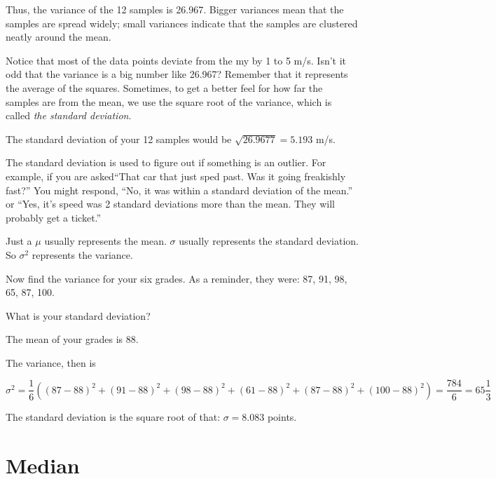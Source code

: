 Thus, the variance of the 12 samples is 26.967.  Bigger variances mean
that the samples are spread widely; small variances indicate that the
samples are clustered neatly around the mean.

Notice that most of the data points deviate from the my by 1 to 5
m/s. Isn't it odd that the variance is a big number like 26.967?
Remember that it represents the average of the squares. Sometimes, to
get a better feel for how far the samples are from the mean, we use
the square root of the variance, which is called \textit{the standard
  deviation}.

The standard deviation of your 12 samples would be $\sqrt{26.9677} =
  5.193$ m/s.

The standard deviation is used to figure out if something is an
outlier. For example, if you are asked``That car that just sped
past. Was it going freakishly fast?'' You might respond, ``No, it was
within a standard deviation of the mean.'' or ``Yes, it's speed was 2
standard deviations more than the mean. They will probably get a ticket.''

Just a $\mu$ usually represents the mean. $\sigma$ usually represents
the standard deviation.  So $\sigma^2$ represents the variance.

\begin{Exercise}[title={Variance of Grades}, label=grades_variance]

  Now find the variance for your six grades.  As a reminder, they were: 87, 91, 98, 65, 87, 100.

  What is your standard deviation?

\end{Exercise}
\begin{Answer}[ref=grades_variance]

  The mean of your grades is $88$.

  The variance, then is

  $$\sigma^2 = \frac{1}{6} \left((87 - 88)^2 + (91 - 88)^2 + (98 - 88)^2 + (61 - 88)^2 + (87 - 88)^2 + (100 - 88)^2 \right) = \frac{784}{6} = 65 \frac{1}{3}$$

  The standard deviation is the square root of that: $\sigma = 8.083$ points.
  
\end{Answer}


\section{Median}

